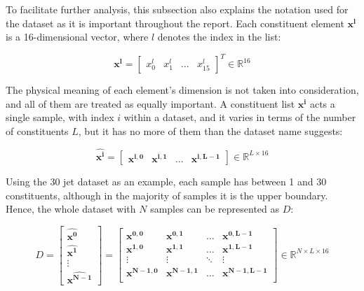To facilitate further analysis, this subsection also explains the notation used for the dataset as it is important throughout the report. Each constituent element \(\bm{x^l}\) is a 16-dimensional vector, where \(l\) denotes the index in the list:

\begin{equation}
  \bm{x^l} =
  \begin{bmatrix}
    x^l_{0} & x^l_{1} & \hdots & x^l_{15}
  \end{bmatrix}^T \in \mathbb{R}^{16}
\end{equation}

The physical meaning of each element's dimension is not taken into consideration, and all of them are treated as equally important. A constituent list \(\bm{x^i}\) acts a single sample, with index \(i\) within a dataset, and it varies in terms of the number of constituents \(L\), but it has no more of them than the dataset name suggests:

\begin{equation}
  \bm{\hat{x^i}} =
  \begin{bmatrix}
    \bm{x^{i,0}} & \bm{x^{i,1}} & \hdots & \bm{x^{i,L-1}}
  \end{bmatrix} \in \mathbb{R}^{L \times 16}
\end{equation}

Using the 30 jet dataset as an example, each sample has between 1 and 30 constituents, although in the majority of samples it is the upper boundary. Hence, the whole dataset with \(N\) samples can be represented as \(D\):

\begin{equation}
  D =
  \begin{bmatrix}
    \bm{\hat{x^0}} \\
    \bm{\hat{x^1}} \\
    \vdots \\
    \bm{\hat{x^{N-1}}}
  \end{bmatrix} =
  \begin{bmatrix}
    \bm{x^{0,0}} & \bm{x^{0,1}} & \hdots & \bm{x^{0,L-1}} \\
    \bm{x^{1,0}} & \bm{x^{1,1}} & \hdots & \bm{x^{1,L-1}} \\
    \vdots & \vdots & \ddots & \vdots \\
    \bm{x^{N-1,0}} & \bm{x^{N-1,1}} & \hdots & \bm{x^{N-1,L-1}} \\
  \end{bmatrix} \in \mathbb{R}^{N \times L \times 16}
\end{equation}

